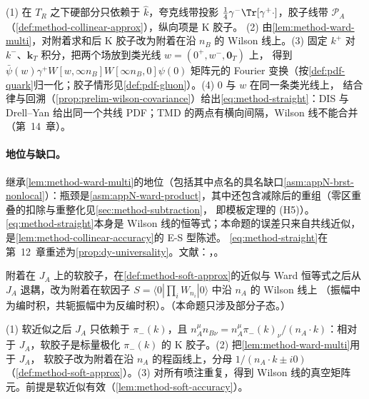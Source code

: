 \begin{proofsketch}
(1) 在 $T_R$ 之下硬部分只依赖于 $\hat k$，夸克线带投影 $\frac14\gamma^-\Tr[\gamma^+\cdot]$，胶子线带 $\mathcal P_A$（\cref{def:method-collinear-approx}），纵向项是 K 胶子。
(2) 由\cref{lem:method-ward-multi}，对附着求和后 K 胶子改为附着在沿 $n_B$ 的 Wilson 线上。(3) 固定 $k^+$ 对 $k^-$、$\mathbf k_T$ 积分，把两个场放到类光线 $w=(0^+,w^-,\mathbf 0_T)$ 上，
得到 $\bar\psi(w)\gamma^+W[w,\infty n_B]W[\infty n_B,0]\psi(0)$ 矩阵元的 Fourier 变换（按\cref{def:pdf-quark}归一化；胶子情形见\cref{def:pdf-gluon}）。(4) $0$ 与 $w$ 在同一条类光线上，
结合律与回溯（\cref{prop:prelim-wilson-covariance}）给出\cref{eq:method-straight}：DIS 与 Drell--Yan 给出同一个共线 PDF；TMD 的两点有横向间隔，Wilson 线不能合并（第~14~章）。
\end{proofsketch}

\paragraph{地位与缺口。}继承\cref{lem:method-ward-multi}的地位（包括其中点名的具名缺口\cref{asm:appN-brst-nonlocal}）：瓶颈是\cref{asm:appN-ward-product}，其中还包含减除后的重组（零区重叠的扣除与重整化见\cref{sec:method-subtraction}，
即模板定理的 (H5)）。\cref{eq:method-straight}本身是 Wilson 线的恒等式；本命题的误差只来自共线近似，是\cref{lem:method-collinear-accuracy}的 E-S 型陈述。
\cref{eq:method-straight}在第~12~章重述为\cref{prop:dy-universality}。文献：\cite{CollinsSoper1982a}，\cite[第~11.9~节]{Collins2011}。

\begin{proposition}\label{prop:method-soft-wilson}
附着在 $J_A$ 上的软胶子，在\cref{def:method-soft-approx}的近似与 Ward 恒等式之后从 $J_A$ 退耦，改为附着在软因子 $S=\langle0|\prod_iW_{n_i}|0\rangle$ 中沿 $n_A$ 的 Wilson 线上
（振幅中为编时积，共轭振幅中为反编时积）。（本命题只涉及部分子态。）
\end{proposition}

\begin{proofsketch}
(1) 软近似之后 $J_A$ 只依赖于 $\pi_-(k)$，且 $n_A^\mu n_{B\nu}=n_A^\mu\pi_-(k)_\nu/(n_A\cdot k)$：相对于 $J_A$，软胶子是标量极化 $\pi_-(k)$ 的 K 胶子。(2) 把\cref{lem:method-ward-multi}用于 $J_A$，
软胶子改为附着在沿 $n_A$ 的程函线上，分母 $1/(n_A\cdot k\pm i0)$（\cref{def:method-soft-approx}）。(3) 对所有喷注重复，得到 Wilson 线的真空矩阵元。前提是软近似有效（\cref{lem:method-soft-accuracy}）。
\end{proofsketch}

